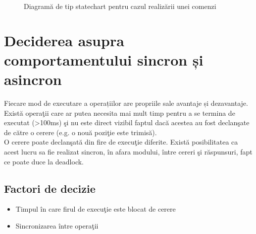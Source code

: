 \begin{figure}[h!]
  \centering
  \caption{Diagramă de tip statechart pentru cazul realizării unei comenzi}
  \end{figure}	

\section{Deciderea asupra comportamentului sincron și asincron} 
	Fiecare mod de executare a operațiilor are propriile sale avantaje și dezavantaje.
	Există operaţii care ar putea necesita mai mult timp pentru a se termina de executat (>100ms) şi nu este direct vizibil faptul dacă acestea au fost declanşate de către o cerere (e.g. o  nouă poziţie este trimisă).
	\vspace{6pt}
    \\O cerere poate declanşată din fire de execuţie diferite.
	Există posibilitatea ca acest lucru sa fie realizat sincron, în afara modului, între cereri şi răspunsuri, fapt ce poate duce la deadlock.

	\subsection{Factori de decizie} 
	\begin{itemize}
	 \setlength\itemsep{0em}
		\item Timpul în care firul de execuţie este blocat de cerere
		\item Sincronizarea între operaţii
	\end{itemize}

